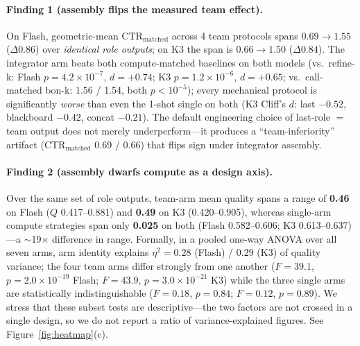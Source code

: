 \documentclass[sigconf,anonymous]{aamas}
\newcommand{\ctrm}{\mathrm{CTR}_{\text{matched}}}
\begin{document}
\paragraph{Finding 1 (assembly flips the measured team effect).} On Flash, geometric-mean $\ctrm$ across 4 team protocols spans $\mathbf{0.69 \to 1.55}$ ($\Delta 0.86$) over \emph{identical role outputs}; on K3 the span is $\mathbf{0.66 \to 1.50}$ ($\Delta 0.84$). The integrator arm beats both compute-matched baselines on both models (vs.\ refine-k: Flash $p=4.2\times10^{-7}$, $d=+0.74$; K3 $p=1.2\times10^{-6}$, $d=+0.65$; vs.\ call-matched bon-k: 1.56 / 1.54, both $p<10^{-5}$); every mechanical protocol is significantly \emph{worse} than even the 1-shot single on both (K3 Cliff's $d$: last $-0.52$, blackboard $-0.42$, concat $-0.21$). The default engineering choice of last-role $=$ team output does not merely underperform---it produces a ``team-inferiority'' artifact ($\ctrm$ 0.69 / 0.66) that flips sign under integrator assembly.

\paragraph{Finding 2 (assembly dwarfs compute as a design axis).} Over the same set of role outputs, team-arm mean quality spans a range of \textbf{0.46} on Flash ($Q$ 0.417--0.881) and \textbf{0.49} on K3 (0.420--0.905), whereas single-arm compute strategies span only \textbf{0.025} on both (Flash 0.582--0.606; K3 0.613--0.637)---a $\sim$19$\times$ difference in range. Formally, in a pooled one-way ANOVA over all seven arms, arm identity explains $\eta^2 = 0.28$ (Flash) / $0.29$ (K3) of quality variance; the four team arms differ strongly from one another ($F=39.1$, $p=2.0\times10^{-19}$ Flash; $F=43.9$, $p=3.0\times10^{-21}$ K3) while the three single arms are statistically indistinguishable ($F=0.18$, $p=0.84$; $F=0.12$, $p=0.89$). We stress that these subset tests are descriptive---the two factors are not crossed in a single design, so we do not report a ratio of variance-explained figures. See Figure~\ref{fig:heatmap}(c).
\end{document}
